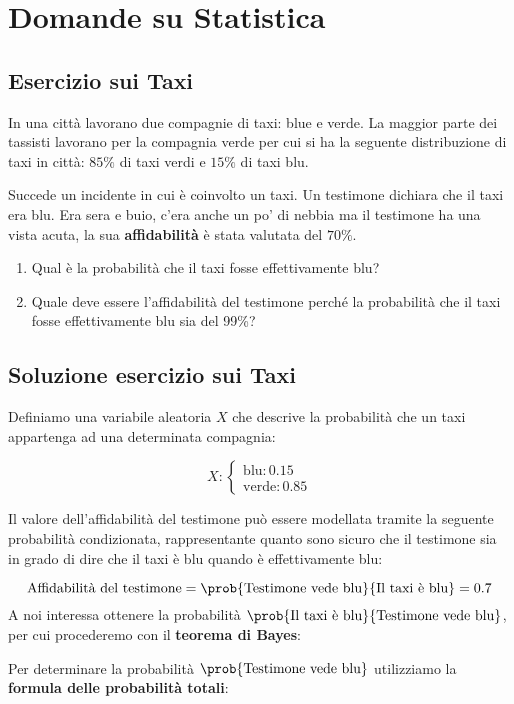 \documentclass[\main/main.tex]{subfiles}
\begin{document}
\section{Domande su Statistica}
\subsection{Esercizio sui Taxi}
In una città lavorano due compagnie di taxi: blue e verde.
La maggior parte dei tassisti lavorano per la compagnia verde per cui si ha la seguente distribuzione di taxi in città: $85\%$ di taxi verdi e $15\%$ di taxi blu.

Succede un incidente in cui è coinvolto un taxi. Un testimone dichiara che il taxi era blu. Era sera e buio, c'era anche un po' di nebbia ma il testimone ha una vista acuta, la sua \textbf{affidabilità} è stata valutata del $70\%$.

\begin{enumerate}
  \item Qual è la probabilità che il taxi fosse effettivamente blu?
  \item Quale deve essere l'affidabilità del testimone perché la probabilità che il taxi fosse effettivamente blu sia del 99\%?
\end{enumerate}

\subsection{Soluzione esercizio sui Taxi}
Definiamo una variabile aleatoria $X$ che descrive la probabilità che un taxi appartenga ad una determinata compagnia:

\[
  X: \begin{cases}
    \text{blu}: 0.15 \\
    \text{verde}: 0.85
  \end{cases}
\]

Il valore dell'affidabilità del testimone può essere modellata tramite la seguente probabilità condizionata, rappresentante quanto sono sicuro che il testimone sia in grado di dire che il taxi è blu quando è effettivamente blu:

\[
  \text{Affidabilità del testimone} = \prob{\text{Testimone vede blu}}{\text{Il taxi è blu}} = 0.7
\]
A noi interessa ottenere la probabilità $\prob{\text{Il taxi è blu}}{\text{Testimone vede blu}}$, per cui procederemo con il \textbf{teorema di Bayes}:

\bayesTh

Per determinare la probabilità $\prob{\text{Testimone vede blu}}$ utilizziamo la \textbf{formula delle probabilità totali}:
\end{document}
